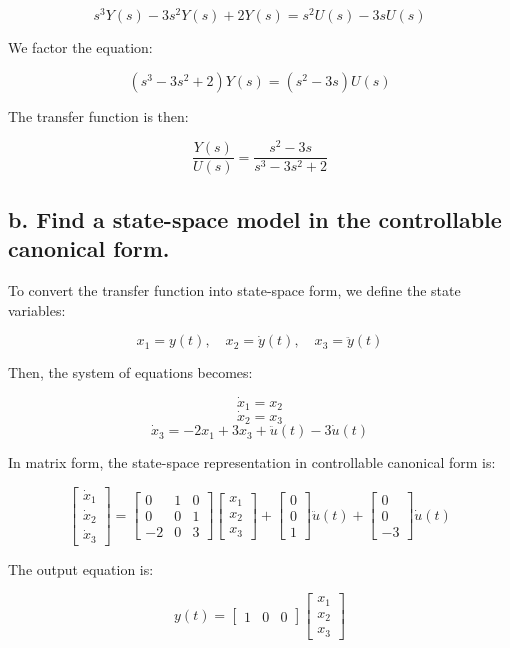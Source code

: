 \documentclass{article}
\begin{document}
\[
s^3 Y(s) - 3s^2 Y(s) + 2 Y(s) = s^2 U(s) - 3s U(s)
\]

We factor the equation:

\[
(s^3 - 3s^2 + 2) Y(s) = (s^2 - 3s) U(s)
\]

The transfer function is then:

\[
\frac{Y(s)}{U(s)} = \frac{s^2 - 3s}{s^3 - 3s^2 + 2}
\]

\subsection*{b. Find a state-space model in the controllable canonical form.}

To convert the transfer function into state-space form, we define the state variables:

\[
x_1 = y(t), \quad x_2 = \dot{y}(t), \quad x_3 = \ddot{y}(t)
\]

Then, the system of equations becomes:

\[
\dot{x}_1 = x_2
\]
\[
\dot{x}_2 = x_3
\]
\[
\dot{x}_3 = -2x_1 + 3x_3 + \ddot{u}(t) - 3\dot{u}(t)
\]

In matrix form, the state-space representation in controllable canonical form is:

\[
\begin{bmatrix}
\dot{x}_1 \\
\dot{x}_2 \\
\dot{x}_3
\end{bmatrix}
=
\begin{bmatrix}
0 & 1 & 0 \\
0 & 0 & 1 \\
-2 & 0 & 3
\end{bmatrix}
\begin{bmatrix}
x_1 \\
x_2 \\
x_3
\end{bmatrix}
+
\begin{bmatrix}
0 \\
0 \\
1
\end{bmatrix}
\ddot{u}(t) + 
\begin{bmatrix}
0 \\
0 \\
-3
\end{bmatrix} \dot{u}(t)
\]

The output equation is:

\[
y(t) = \begin{bmatrix} 1 & 0 & 0 \end{bmatrix} \begin{bmatrix} x_1 \\ x_2 \\ x_3 \end{bmatrix}
\]
\end{document}
